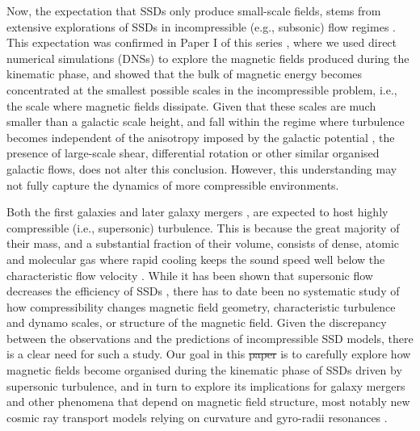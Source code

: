 \documentclass[12pt,twoside]{extreport}
\makeatletter
\newcommand{\ie}{i.e.,\xspace} %
\newcommand{\eg}{e.g.,\xspace} %
\providecommand{\DIFaddtex}[1]{{\protect\color{DIFgreen}\uwave{#1}}} %
\providecommand{\DIFdeltex}[1]{{\protect\color{DIFpurple}\sout{#1}}} %
\providecommand{\DIFaddbegin}{} %
\providecommand{\DIFaddend}{} %
\providecommand{\DIFdelbegin}{} %
\providecommand{\DIFdelend}{} %
\providecommand{\DIFadd}[1]{\texorpdfstring{\DIFaddtex{#1}}{#1}} %
\providecommand{\DIFdel}[1]{\texorpdfstring{\DIFdeltex{#1}}{}} %
\providecommand{\DIFscaledelfig}{0.5}
\newlength{\DIFdelgraphicswidth} %
\newlength{\DIFdelgraphicsheight} %
\providecommand{\DIFaddincludegraphics}[2][]{{\color{DIFgreen}\fbox{\DIFOincludegraphics[#1]{#2}}}} %
\providecommand{\DIFdelincludegraphics}[2][]{%
\sbox{\DIFdelgraphicsbox}{\DIFOincludegraphics[#1]{#2}}%
\settoboxwidth{\DIFdelgraphicswidth}{\DIFdelgraphicsbox} %
\settoboxtotalheight{\DIFdelgraphicsheight}{\DIFdelgraphicsbox} %
\scalebox{\DIFscaledelfig}{%
\parbox[b]{\DIFdelgraphicswidth}{\usebox{\DIFdelgraphicsbox}\\[-\baselineskip] \rule{\DIFdelgraphicswidth}{0em}}\llap{\resizebox{\DIFdelgraphicswidth}{\DIFdelgraphicsheight}{%
\setlength{\unitlength}{\DIFdelgraphicswidth}%
\begin{picture}(1,1)%
\thicklines\linethickness{2pt} %
{\color{DIFpurple}\put(0,0){\framebox(1,1){}}}%
{\color{DIFpurple}\put(0,0){\line( 1,1){1}}}%
{\color{DIFpurple}\put(0,1){\line(1,-1){1}}}%
\end{picture}%
}\hspace*{3pt}}} %
} %
\DeclareRobustCommand{\DIFaddbegin}{\DIFOaddbegin \let\includegraphics\DIFaddincludegraphics} %
\DeclareRobustCommand{\DIFaddend}{\DIFOaddend \let\includegraphics\DIFOincludegraphics} %
\DeclareRobustCommand{\DIFdelbegin}{\DIFOdelbegin \let\includegraphics\DIFdelincludegraphics} %
\DeclareRobustCommand{\DIFdelend}{\DIFOaddend \let\includegraphics\DIFOincludegraphics} %
\let\sout@orig\sout %
\renewcommand{\sout}[1]{\ifmmode\text{\sout@orig{\ensuremath{#1}}}\else\sout@orig{#1}\fi} %
\makeatother
\begin{document}
Now, the expectation that SSDs only produce small-scale fields, stems from extensive explorations of SSDs in incompressible (\eg subsonic) flow regimes \citep[see seminal works by, \eg][]{kazantsev1968, vainshtein1982theory, vincenzi2002kraichnan, schekochihin2004simulations, boldyrev2004magnetic}. This expectation was confirmed in Paper I of this series \citep[][herein ]{kriel2022fundamental}, where we used direct numerical simulations (DNSs) to explore the magnetic fields produced during the kinematic phase, and showed that the bulk of magnetic energy becomes concentrated at the smallest possible scales in the incompressible problem, \ie the scale where magnetic fields dissipate. Given that these scales are much smaller than a galactic scale height, and fall within the regime where turbulence becomes independent of the anisotropy imposed by the galactic potential \citep{Kortgen2021_power_spectrum_of_isolated_galaxies}, the presence of large-scale shear, differential rotation or other similar organised galactic flows, does not alter this conclusion. However, this understanding may not fully capture the dynamics of more compressible environments.

Both the first galaxies \citep{maio2011impact, mandelker2020instability} and later galaxy mergers \citep{geng2012magnetic, sparre2022gas}, are expected to host highly compressible (\ie supersonic) turbulence. This is because the great majority of their mass, and a substantial fraction of their volume, consists of dense, atomic and molecular gas \citep{cox2006kinematic, krumholz2009star, popping2014evolution, nandakumar2023large} where rapid cooling keeps the sound speed well below the characteristic flow velocity \citep{rees1977cooling, white1978core, birnboim2003virial, Krumholz2020_cr_transport_starburst, li2020impact}. While it has been shown that supersonic flow decreases the efficiency of SSDs \citep{federrath2011mach, federrath2014turbulent, seta2021saturation, seta2022turbulent, hew2023lagrangian}, there has to date been no systematic study of how compressibility changes magnetic field geometry, characteristic turbulence and dynamo scales, or structure of the magnetic field. Given the discrepancy between the observations and the predictions of incompressible SSD models, there is a clear need for such a study. Our goal in this \DIFdelbegin \DIFdel{paper }\DIFdelend \DIFaddbegin \DIFadd{chapter }\DIFaddend is to carefully explore how magnetic fields become organised during the kinematic phase of SSDs driven by supersonic turbulence, and in turn to explore its implications for galaxy mergers and other phenomena that depend on magnetic field structure, most notably new cosmic ray transport models relying on curvature and gyro-radii resonances \citep[\eg][]{kempski2023cosmic, Lemoine2023_field_reversal_CR_transport}.
\end{document}
